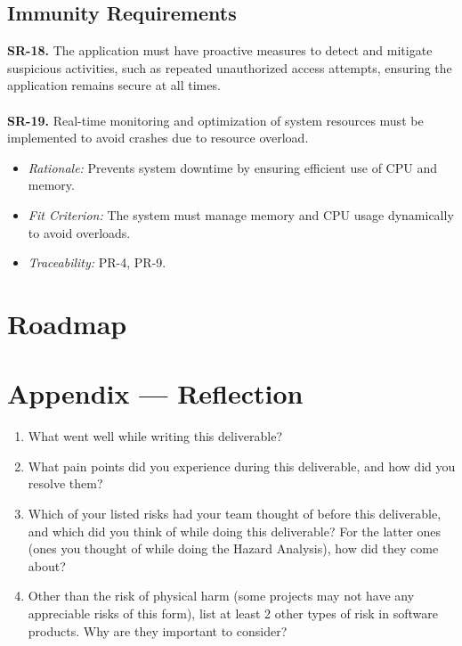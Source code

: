 \documentclass{article}
\begin{document}
\subsection{Immunity Requirements}
\textbf{SR-18.} The application must have proactive measures to detect and
  mitigate suspicious activities, such as repeated unauthorized access attempts,
  ensuring the application remains secure at all times. \ \\
  \ \\
  \textbf{SR-19.} Real-time monitoring and optimization of system resources must
  be implemented to avoid crashes due to resource overload.
    \begin{itemize}
      \item \textit{Rationale:} Prevents system downtime by ensuring efficient
      use of CPU and memory.
      \item \textit{Fit Criterion:} The system must manage memory and CPU usage
      dynamically to avoid overloads.
      \item \textit{Traceability:} PR-4, PR-9.
    \end{itemize}

\section{Roadmap}


\newpage{}

\section*{Appendix --- Reflection}




\begin{enumerate}
    \item What went well while writing this deliverable? 
    \item What pain points did you experience during this deliverable, and how
    did you resolve them?
    \item Which of your listed risks had your team thought of before this
    deliverable, and which did you think of while doing this deliverable? For
    the latter ones (ones you thought of while doing the Hazard Analysis), how
    did they come about?
    \item Other than the risk of physical harm (some projects may not have any
    appreciable risks of this form), list at least 2 other types of risk in
    software products. Why are they important to consider?
\end{enumerate}
\end{document}
